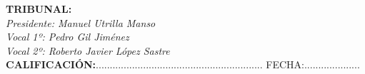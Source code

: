 \begin{flushleft}
\textbf{TRIBUNAL:}\\
\vspace{1.5cm}
\textit{Presidente: Manuel Utrilla Manso}\\
\vspace{1.5cm}
\textit{Vocal 1º: Pedro Gil Jiménez}\\
\vspace{1.5cm}
\textit{Vocal 2º: Roberto Javier López Sastre}\\
\vspace{1.5cm}
\textbf{CALIFICACIÓN:}............................................................ FECHA:.................... \\
\end{flushleft}

\newpage
\thispagestyle{empty}
\hspace*{0.5cm}
\newpage

